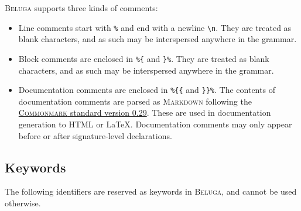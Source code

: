 \documentclass[11pt]{article}
\newcommand{\Beluga}{\textsc{Beluga}\xspace}
\begin{document}
\Beluga supports three kinds of comments:

\begin{itemize}
\item
Line comments start with \texttt{\%} and end with a newline \texttt{\textbackslash n}.
They are treated as blank characters, and as such may be interspersed anywhere in the grammar.
\item
Block comments are enclosed in \texttt{\%\{} and \texttt{\}\%}.
They are treated as blank characters, and as such may be interspersed anywhere in the grammar.
\item
Documentation comments are enclosed in \texttt{\%\{\{} and \texttt{\}\}\%}.
The contents of documentation comments are parsed as \textsc{Markdown} following the \href{https://spec.commonmark.org/0.29}{\textsc{Commonmark} standard version 0.29}.
These are used in documentation generation to \textsc{HTML} or \LaTeX.
Documentation comments may only appear before or after signature-level declarations.
\end{itemize}

\subsection{Keywords}

The following identifiers are reserved as keywords in \Beluga, and cannot be used otherwise.
\end{document}

